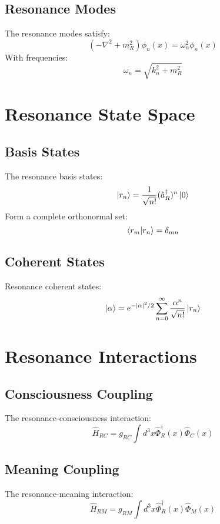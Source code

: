 \documentclass[12pt]{article}
\begin{document}
\subsection{Resonance Modes}
The resonance modes satisfy:
\begin{equation}
(-\nabla^2 + m_R^2)\phi_n(x) = \omega_n^2\phi_n(x)
\end{equation}
With frequencies:
\begin{equation}
\omega_n = \sqrt{k_n^2 + m_R^2}
\end{equation}
\section{Resonance State Space}
\subsection{Basis States}
The resonance basis states:
\begin{equation}
\ket{r_n} = \frac{1}{\sqrt{n!}}(\hat{a}_R^\dagger)^n\ket{0}
\end{equation}
Form a complete orthonormal set:
\begin{equation}
\braket{r_m|r_n} = \delta_{mn}
\end{equation}
\subsection{Coherent States}
Resonance coherent states:
\begin{equation}
\ket{\alpha} = e^{-|\alpha|^2/2}\sum_{n=0}^\infty \frac{\alpha^n}{\sqrt{n!}}\ket{r_n}
\end{equation}
\section{Resonance Interactions}
\subsection{Consciousness Coupling}
The resonance-consciousness interaction:
\begin{equation}
\hat{H}_{RC} = g_{RC}\int d^3x \hat{\Phi}_R^\dagger(x)\hat{\Phi}_C(x)
\end{equation}
\subsection{Meaning Coupling}
The resonance-meaning interaction:
\begin{equation}
\hat{H}_{RM} = g_{RM}\int d^3x \hat{\Phi}_R^\dagger(x)\hat{\Phi}_M(x)
\end{equation}
\end{document}
